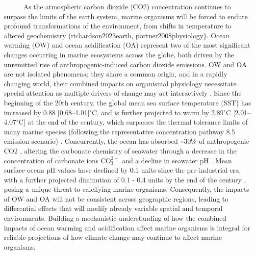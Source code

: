 \documentclass[
]{article}
\begin{document}
~~~~~ As the atmospheric carbon dioxide (CO2) concentration continues to
surpass the limits of the earth system, marine organisms will be forced
to endure profound transformations of the environment, from shifts in
temperature to altered geochemistry (richardson2023earth,
portner2008physiology\}. Ocean warming (OW) and ocean acidification (OA)
represent two of the most significant changes occurring in marine
ecosystems across the globe, both driven by the unremitted rise of
anthropogenic-induced carbon dioxide emissions. OW and OA are not
isolated phenomena; they share a common origin, and in a rapidly
changing world, their combined impacts on organismal physiology
necessitate special attention as multiple drivers of change may act
interactively \citep{cote2016interactions}. Since the beginning of the
20th century, the global mean sea surface temperature (SST) has
increased by 0.88 {[}0.68--1.01{]}\(^\circ\)C, and is further projected
to warm by 2.89\(^\circ\)C {[}2.01--4.07\(^\circ\)C{]} at the end of the
century, which surpasses the thermal tolerance limits of many marine
species (following the representative concentration pathway 8.5 emission
scenario)
\citep{kikstra2022ipcc, fox2021ocean, bay2017genomic, somero2010physiology}.
Concurrently, the ocean has absorbed \textasciitilde30\% of
anthropogenic CO2 \citep{feely2004impact}, altering the carbonate
chemistry of seawater through a decrease in the concentration of
carbonate ions \(\mathrm{CO_3^{2-}}\) and a decline in seawater pH
\citep{feely2004impact}. Mean surface ocean pH values have declined by
0.1 units since the pre-industrial era, with a further projected
diminution of 0.1 - 0.4 units by the end of the century
\citep{change2014impacts, orr2005anthropogenic}, posing a unique threat
to calcifying marine organisms. Consequently, the impacts of OW and OA
will not be consistent across geographic regions, leading to
differential effects that will modify already variable spatial and
temporal environments. Building a mechanistic understanding of how the
combined impacts of ocean warming and acidification affect marine
organisms is integral for reliable projections of how climate change may
continue to affect marine organisms.
\end{document}
